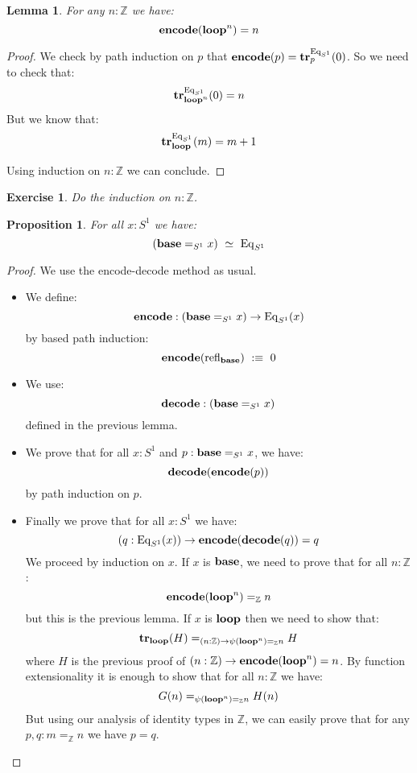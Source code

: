 \documentclass{article}
\newcommand{\encode}{\mathrm{\bf encode}}
\newcommand{\decode}{\mathrm{\bf decode}}
\newcommand{\U}{{\mathcal U}}
\renewcommand{\r}{\rightarrow}
\newcommand{\Gl}{\lambda}
\newcommand{\ap}{\mathrm{ap}}
\newcommand{\refl}{\mathrm{refl}}
\newcommand{\tr}{\mathrm{\bf tr}}
\newcommand{\ua}{\mathrm{\bf ua}}
\newcommand{\base}{\mathrm{\bf base}}
\renewcommand{\loop}{\mathrm{\bf loop}}
\newcommand{\Eq}{\mathrm{Eq}}
\newtheorem{lemma}{Lemma}
\newtheorem{proposition}{Proposition}
\newtheorem{exercise}{Exercise}
\begin{document}
\begin{lemma}
For any $n:\mathbb{Z}$ we have:
\[\encode(\loop^n) = n\]
\end{lemma}
\begin{proof}
We check by path induction on $p$ that $\encode(p) = \tr^{\Eq_{S^1}}_p(0)$. So we need to check that: 
\[\tr^{\Eq_{S^1}}_{\loop^n}(0) = n\]
But we know that:%
\[\tr^{\Eq_{S^1}}_\loop(m) = m+1\]

Using induction on $n:\mathbb{Z}$ we can conclude. %
\end{proof}

\begin{exercise}
Do the induction on $n:\mathbb{Z}$.
\end{exercise}

\begin{proposition}
For all $x:S^1$ we have:
\[(\base=_{S^1}x) \ \simeq \ \Eq_{S^1}\]
\end{proposition}
\begin{proof}
We use the encode-decode method as usual.
\begin{itemize}
\item We define:
\[\encode : (\base=_{S^1}x) \r \Eq_{S^1}(x)\]
by based path induction:
\[\encode(\refl_\base) \ :\equiv\ 0\]
\item We use:
\[\decode : (\base=_{S^1}x)\] 
defined in the previous lemma.
\item We prove that for all $x:S^1$ and $p:\base=_{S^1}x$, we have:
\[\decode(\encode(p))\]
by path induction on $p$.
\item Finally we prove that for all $x:S^1$ we have:
\[(q:\Eq_{S^1}(x)) \r \encode(\decode(q)) = q\]
We proceed by induction on $x$.
\subitem If $x$ is $\base$, we need to prove that for all $n:\mathbb{Z}$:
\[\encode(\loop^n) =_{\mathbb{Z}} n \]
but this is the previous lemma.
\subitem If $x$ is $\loop$ then we need to show that:
\[\tr_\loop(H) =_{(n:\mathbb{Z}) \r \psi(\loop^n) =_{\mathbb{Z}} n} H\]
where $H$ is the previous proof of $(n:\mathbb{Z})\r \encode(\loop^n) = n$. By function extensionality it is enough to show that for all $n:\mathbb{Z}$ we have:
\[G(n) =_{\psi(\loop^n) =_{\mathbb{Z}} n} H(n)\]
But using our analysis of identity types in $\mathbb{Z}$, we can easily prove that for any $p,q:m=_{\mathbb{Z}} n$ we have $p=q$.
\end{itemize}
\end{proof}
\end{document}
